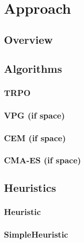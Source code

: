 \section{Approach}
\label{approach}

\subsection{Overview}

\subsection{Algorithms}

\subsubsection{TRPO}

\cite{TRPO}

\subsubsection{VPG (if space)}
\subsubsection{CEM (if space)}
\subsubsection{CMA-ES (if space)}

\subsection{Heuristics}
\subsubsection{Heuristic}
\subsubsection{SimpleHeuristic}


